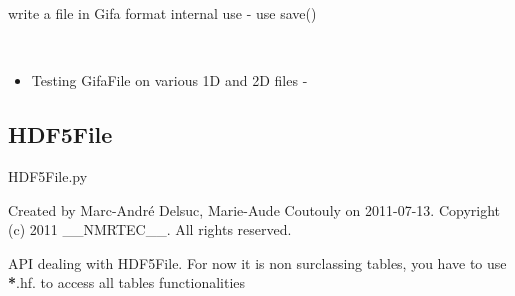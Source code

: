 \documentclass[letterpaper,10pt,openany,oneside]{sphinxmanual}
\begin{document}
\begin{fulllineitems}
\begin{fulllineitems}
\end{fulllineitems}


\begin{fulllineitems}
\label{rst/code:File.GifaFile.GifaFile.writec}
write a file in Gifa format
internal use - use save()

\end{fulllineitems}


\end{fulllineitems}


\begin{fulllineitems}
\label{rst/code:File.GifaFile.GifaFileTests}~\begin{itemize}
\item {} 
Testing GifaFile on various 1D and 2D files -

\end{itemize}

\begin{fulllineitems}
\label{rst/code:File.GifaFile.GifaFileTests.tempfile}
\end{fulllineitems}


\end{fulllineitems}



\subsection{HDF5File}
\label{rst/code:hdf5file}\label{rst/code:module-File.HDF5File}
HDF5File.py

Created by Marc-André Delsuc, Marie-Aude Coutouly on 2011-07-13.
Copyright (c) 2011 \_\_NMRTEC\_\_. All rights reserved.

API dealing with HDF5File. For now it is non surclassing tables, you have to use {\color{red}\bfseries{}*}.hf. to access all tables functionalities
\end{document}
